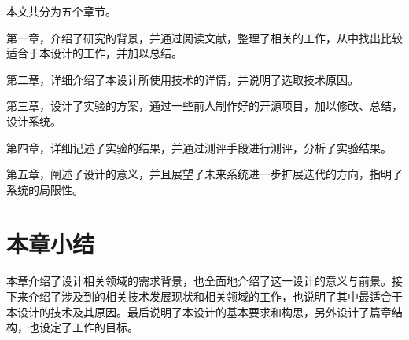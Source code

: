 本文共分为五个章节。

第一章，介绍了研究的背景，并通过阅读文献，整理了相关的工作，从中找出比较适合于本设计的工作，并加以总结。

第二章，详细介绍了本设计所使用技术的详情，并说明了选取技术原因。

第三章，设计了实验的方案，通过一些前人制作好的开源项目，加以修改、总结，设计系统。

第四章，详细记述了实验的结果，并通过测评手段进行测评，分析了实验结果。

第五章，阐述了设计的意义，并且展望了未来系统进一步扩展迭代的方向，指明了系统的局限性。

\section{本章小结}
本章介绍了设计相关领域的需求背景，也全面地介绍了这一设计的意义与前景。接下来介绍了涉及到的相关技术发展现状和相关领域的工作，也说明了其中最适合于本设计的技术及其原因。最后说明了本设计的基本要求和构思，另外设计了篇章结构，也设定了工作的目标。